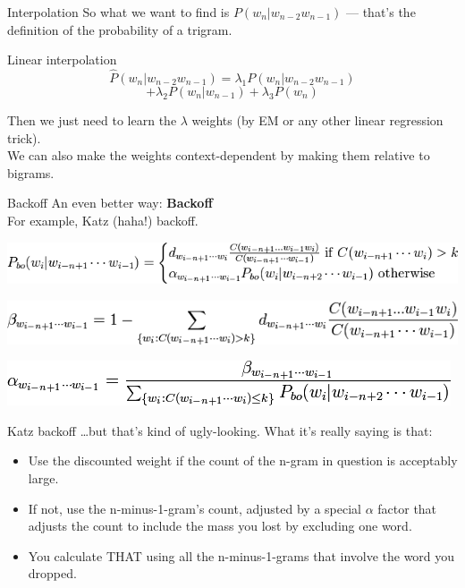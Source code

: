 \documentclass{beamer}
\begin{document}
\begin{frame}{Interpolation}
  So what we want to find is $P(w_n|w_{n-2}w_{n-1})$ --- that's 
  the definition of the probability of a trigram.\pause
  \begin{block}{Linear interpolation}
    \[\hat{P}(w_n|w_{n-2}w_{n-1}) = \lambda_1 P(w_n|w_{n-2}w_{n-1})\]
    \[+ \lambda_2 P(w_n|w_{n-1}) + \lambda_3 P(w_n)\]
  \end{block}\pause
  Then we just need to learn the $\lambda$ weights (by EM or 
  any other linear regression trick).\\\pause
  We can also make the weights context-dependent by making them relative
  to bigrams.
\end{frame}

\begin{frame}{Backoff}
  An even better way: \textbf{Backoff}
  \\ For example, Katz (haha!) backoff.
  \begin{block}{}   
    \includegraphics[width=\textwidth]{images/katzP.png}
  \end{block}
  \begin{block}{}
    \includegraphics[width=\textwidth]{images/katzB.png}
  \end{block}
  \begin{block}{} 
    \includegraphics[width=\textwidth]{images/katzA.png}
  \end{block}
\end{frame}

\begin{frame}{Katz backoff}
  \ldots but that's kind of ugly-looking. What it's really saying is that:\pause
  \begin{itemize}
    \item Use the discounted weight if the count of the n-gram in question 
      is acceptably large.\pause
    \item If not, use the n-minus-1-gram's count, adjusted by a 
      special $\alpha$ factor that adjusts the count to include 
      the mass you lost by excluding one word.\pause
    \item You calculate THAT using all the n-minus-1-grams that
      involve the word you dropped.
  \end{itemize}
\end{frame}
\end{document}
